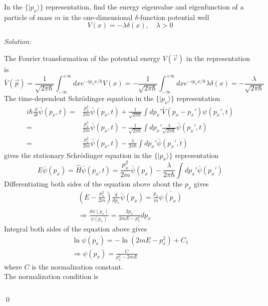 \documentclass[12pt,a4paper]{article}
\newenvironment{problem}[2][Problem]{\begin{trivlist}
\item[\hskip \labelsep {\bfseries #1}\hskip \labelsep {\bfseries #2.}]}{\end{trivlist}}
\newenvironment{sol}
    {\emph{Solution:}
    }
    {
    \qed
    }
\begin{document}
\begin{problem}{3}
In the $\{|p_x\rangle\}$ representation, find the energy eigenvalue and eigenfunction of a particle of mass $m$ in the one-dimensional $\delta$-function potential well
\[
V(x)=-\lambda\delta(x),\quad\lambda>0
\]
\end{problem}
\begin{sol}
The Fourier transformation of the potential energy $V(\vec{r})$ in the representation is
\begin{equation}
\bar{V}(\vec{p})=\frac{1}{\sqrt{2\pi\hbar}}\int_{-\infty}^{+\infty}dxe^{-ip_xx/\hbar}V(x)=-\frac{1}{\sqrt{2\pi\hbar}}\int_{-\infty}^{+\infty}dxe^{-ip_xx/\hbar}\lambda\delta(x)=-\frac{\lambda}{\sqrt{2\pi\hbar}}
\end{equation}
The time-dependent Schrödinger equation in the $\{|p_x\rangle\}$ representation
\begin{align}
\nonumber i\hbar\frac{\partial}{\partial t}\bar{\psi}(p_x,t)=&\frac{p_x^2}{2m}\bar{\psi}(p_x,t)+\frac{1}{\sqrt{2\pi\hbar}}\int dp_x'\bar{V}(p_x-p_x')\psi(p_x',t)\\
\nonumber=&\frac{p_x^2}{2m}\bar{\psi}(p_x,t)-\frac{1}{\sqrt{2\pi\hbar}}\int dp_x'\frac{\lambda}{\sqrt{2\pi\hbar}}\bar{\psi}(p_x',t)\\
=&\frac{p_x^2}{2m}\bar{\psi}(p_x,t)-\frac{\lambda}{2\pi\hbar}\int dp_x'\bar{\psi}(p_x',t)
\end{align}
gives the stationary Schrödinger equation in the $\{|p_x\rangle\}$ representation
\begin{equation}
\nonumber E\bar{\psi}(p_x)=\hat{H}\bar{\psi}(p_x,t)=\frac{p_x^2}{2m}\bar{\psi}(p_x)-\frac{\lambda}{2\pi\hbar}\int dp_x'\bar{\psi}(p_x')
\end{equation}
Differentiating both sides of the equation above about the $p_x$ gives
\begin{gather}
(E-\frac{p_x^2}{2m})\frac{d}{dp_x}\bar{\psi}(p_x)=\frac{p_x}{m}\bar{\psi(p_x)}\\
\Longrightarrow\frac{d\bar{\psi(p_x)}}{\psi(p_x)}=\frac{2p_x}{2mE-p_x^2}dp_x
\end{gather}
Integral both sides of the equation above gives
\begin{gather}
\ln\psi(p_x)=-\ln(2mE-p_x^2)+C_1\\
\Longrightarrow\psi(p_x)=\frac{C}{p_x^2-2mE}
\end{gather}
where $C$ is the normalization constant.\\
The normalization condition is
\begin{gather}
\begin{align}

\end{align}
\end{gather}
\end{sol}
\end{document}
